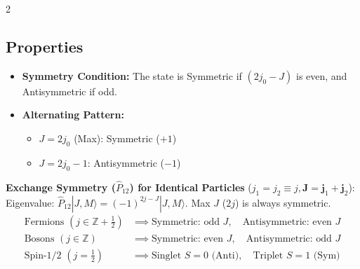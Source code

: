 \documentclass[9pt,a4paper]{article} %
\begin{document}
\begin{multicols}{2}
\subsection{Properties}
\begin{itemize}
    \item \textbf{Symmetry Condition:} The state is Symmetric if $(2j_0 - J)$ is even, and Antisymmetric if odd.
    \item \textbf{Alternating Pattern:} 
    \begin{itemize}
        \item $J = 2j_0$ (Max): Symmetric ($+1$)
        \item $J = 2j_0 - 1$: Antisymmetric ($-1$)
    \end{itemize}
\end{itemize}
\textbf{Exchange Symmetry ($\hat{P}_{12}$) for Identical Particles} ($j_1=j_2\equiv j, \mathbf{J}=\mathbf{j}_1+\mathbf{j}_2$): \\
Eigenvalue: $\hat{P}_{12}|J,M\rangle = (-1)^{2j-J}|J,M\rangle$. Max $J$ ($2j$) is always symmetric.
\begin{align*}
\text{Fermions } (j \in \mathbb{Z}+\tfrac{1}{2}) &\implies \text{Symmetric: odd } J, \quad \text{Antisymmetric: even } J \\
\text{Bosons } (j \in \mathbb{Z}) &\implies \text{Symmetric: even } J, \quad \text{Antisymmetric: odd } J \\
\text{Spin-1/2 } (j=\tfrac{1}{2}) &\implies \text{Singlet } S=0 \text{ (Anti)}, \quad \text{Triplet } S=1 \text{ (Sym)}
\end{align*}

\end{multicols}
\end{document}
